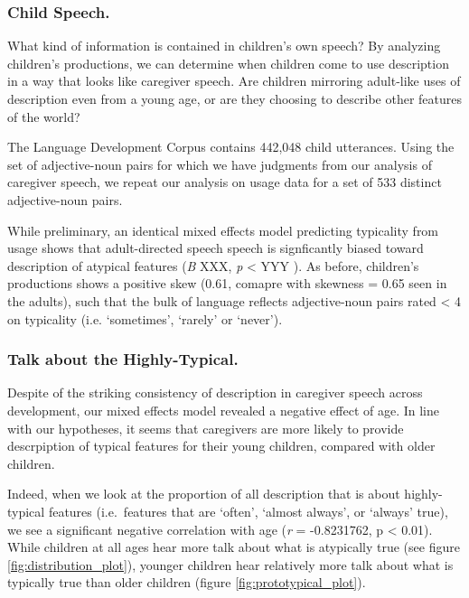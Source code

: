 \documentclass[10pt, letterpaper]{article}
\begin{document}
\hypertarget{child-speech.}{%
\subsubsection{Child Speech.}\label{child-speech.}}

What kind of information is contained in children's own speech? By
analyzing children's productions, we can determine when children come to
use description in a way that looks like caregiver speech. Are children
mirroring adult-like uses of description even from a young age, or are
they choosing to describe other features of the world?

The Language Development Corpus contains 442,048 child utterances. Using
the set of adjective-noun pairs for which we have judgments from our
analysis of caregiver speech, we repeat our analysis on usage data for a
set of 533 distinct adjective-noun pairs.

While preliminary, an identical mixed effects model predicting
typicality from usage shows that adult-directed speech speech is
signficantly biased toward description of atypical features (\emph{B}
XXX, \emph{p} \textless{} YYY ). As before, children's productions shows
a positive skew (0.61, comapre with skewness = 0.65 seen in the adults),
such that the bulk of language reflects adjective-noun pairs rated
\textless{} 4 on typicality (i.e. `sometimes', `rarely' or `never').

\hypertarget{talk-about-the-highly-typical.}{%
\subsubsection{Talk about the
Highly-Typical.}\label{talk-about-the-highly-typical.}}

Despite of the striking consistency of description in caregiver speech
across development, our mixed effects model revealed a negative effect
of age. In line with our hypotheses, it seems that caregivers are more
likely to provide descrpiption of typical features for their young
children, compared with older children.

Indeed, when we look at the proportion of all description that is about
highly-typical features (i.e.~features that are `often', `almost
always', or `always' true), we see a significant negative correlation
with age (\emph{r} = -0.8231762, p \textless{} 0.01). While children at
all ages hear more talk about what is atypically true (see figure
\ref{fig:distribution_plot}), younger children hear relatively more talk
about what is typically true than older children (figure
\ref{fig:prototypical_plot}).
\end{document}
